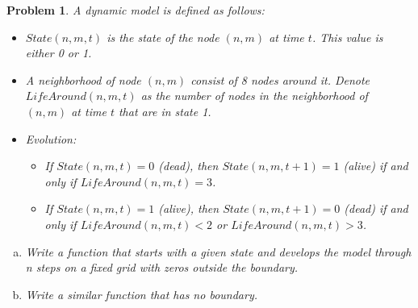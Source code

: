 \documentclass[12pt, letterpaper]{amsart}
\numberwithin{equation}{section} %
\newtheorem{problem}{Problem}
\theoremstyle{definition}
\theoremstyle{remark}
\begin{document}
\begin{problem}
A dynamic model is defined as follows:
\begin{itemize}
\item $State(n,m,t)$ is the state of the node $(n,m)$ at time $t$. This value is either 0 or 1.
\item A neighborhood of node $(n,m)$ consist of 8 nodes around it. Denote $LifeAround(n,m,t)$ as the number of nodes in the neighborhood of $(n,m)$ at time $t$ that are in state 1.
\item Evolution:
    \begin{itemize}
    \item If $State(n,m,t)=0$ (dead), then $State(n,m,t+1)=1$ (alive) if and only if $LifeAround(n,m,t)=3$.
    \item If $State(n,m,t)=1$ (alive), then $State(n,m,t+1)=0$ (dead) if and only if $LifeAround(n,m,t)<2$ or $LifeAround(n,m,t)>3$.
    \end{itemize}
\end{itemize}
\begin{enumerate}[a.]
\item Write a function that starts with a given state and develops the model through n steps on a fixed grid with zeros outside the boundary.
\item Write a similar function that has no boundary.
\end{enumerate}
\end{problem}
\end{document}
